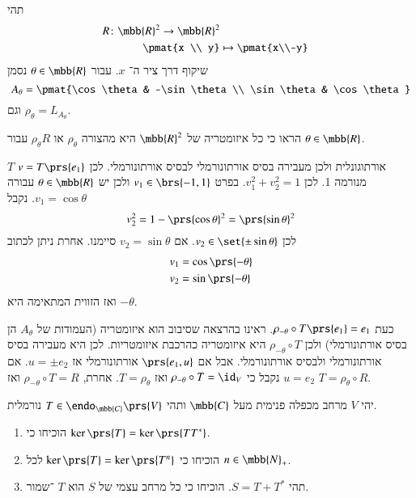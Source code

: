\documentclass[a4paper,10pt,oneside,openany]{article}
\begin{document}
\begin{exercise}
תהי
\begin{align*}
R \colon \mbb{R}^2 \to \mbb{R}^2 \\
\pmat{x \\ y} &\mapsto \pmat{x\\-y}
\end{align*}
שיקוף דרך ציר ה־%
$x$.
עבור
$\theta \in \mbb{R}$
נסמן
\[A_\theta = \pmat{\cos \theta & -\sin \theta \\ \sin \theta & \cos \theta} \]
וגם
$\rho_\theta = L_{A_\theta}$.

הראו כי כל איזומטריה של
$\mbb{R}^2$
היא מהצורה
$\rho_\theta$
או
$\rho_\theta R$
עבור
$\theta \in \mbb{R}$.
\end{exercise}

\begin{solution}
$T$
אורתוגונלית ולכן מעבירה בסיס אורתונורמלי לבסיס אורתונורמלי.
לכן
$v = T\prs{e_1}$
מנורמה 1.
לכן
$v_1^2 + v_2^2 = 1$.
בפרט
$v_1 \in \brs{-1,1}$
ולכן יש
$\theta \in \mbb{R}$
עבורה
$v_1 = \cos \theta$.
נקבל
\[v_2^2 = 1 - \prs{\cos\theta}^2 = \prs{\sin \theta}^2\]
לכן
$v_2 \in \set{\pm \sin{\theta}}$.
אם
$v_2 = \sin \theta$
סיימנו.
אחרת
ניתן לכתוב
\begin{align*}
v_1 &= \cos\prs{-\theta} \\
v_2 &= \sin\prs{-\theta}
\end{align*}
ואז הזווית המתאימה היא
$-\theta$.

כעת
$\rho_{-\theta} \circ T \prs{e_1} = e_1$.
ראינו בהרצאה שסיבוב הוא איזומטריה (העמודות של
$A_\theta$
הן בסיס אורתונורמלי) ולכן
$\rho_{-\theta} \circ T$
היא איזומטריה כהרכבת איזומטריות.
לכן היא מעבירה בסיס אורתונורמלי ולבסיס אורתונורמלי.
אבל אם
$\prs{e_1, u}$
אורתונורמלי אז
$u = \pm e_2$.
אם
$u = e_2$
נקבל כי
$\rho_{-\theta} \circ T = \id_V$
ואז
$T = \rho_{\theta}$.
אחרת,
$\rho_{-\theta} \circ T = R$
ואז
$T = \rho_{\theta} \circ R$.
\end{solution}

\begin{exercise}
יהי
$V$
מרחב מכפלה פנימית מעל
$\mbb{C}$
ותהי
$T \in \endo_{\mbb{C}}\prs{V}$
נורמלית.
\begin{enumerate}
\item הוכיחו כי
$\ker\prs{T} = \ker\prs{T T^*}$.
\item הוכיחו כי
$\ker\prs{T} = \ker\prs{T^n}$
לכל
$n \in \mbb{N}_+$.
\item תהי
$S = T + T^*$.
הוכיחו כי כל מרחב עצמי של
$S$
הוא
$T$%
־שמור.
\end{enumerate}
\end{exercise}
\end{document}
